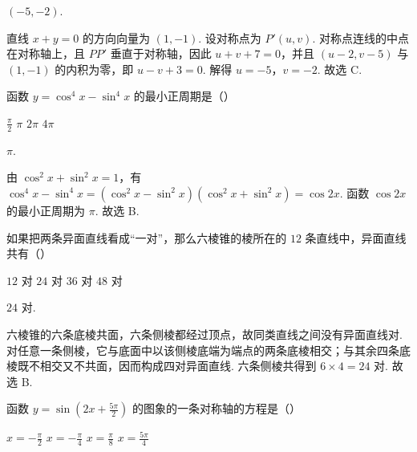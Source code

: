 \documentclass[UTF8,a4paper,oneside,11pt]{ctexbook}
\begin{document}
\begin{answer}
\((-5,-2)\).
\end{answer}

\begin{solution}
直线 \(x+y=0\) 的方向向量为 \((1,-1)\). 设对称点为 \(P'(u,v)\). 对称点连线的中点在对称轴上，且 \(PP'\) 垂直于对称轴，因此 \(u+v+7=0\)，并且 \((u-2,v-5)\) 与 \((1,-1)\) 的内积为零，即 \(u-v+3=0\). 解得 \(u=-5\)，\(v=-2\). 故选 C.
\end{solution}

\begin{problem}
函数 \(y = \cos^{4} x - \sin^{4} x\) 的最小正周期是（\quad）

\choices
    {\(\frac{\pi}{2}\)}
    {\(\pi\)}
    {\(2\pi\)}
    {\(4\pi\)}
\end{problem}

\begin{answer}
\(\pi\).
\end{answer}

\begin{solution}
由 \(\cos^2x+\sin^2x=1\)，有 \(\cos^4x-\sin^4x=(\cos^2x-\sin^2x)(\cos^2x+\sin^2x)=\cos2x\). 函数 \(\cos2x\) 的最小正周期为 \(\pi\). 故选 B.
\end{solution}

\begin{problem}
如果把两条异面直线看成“一对”，那么六棱锥的棱所在的 \(12\) 条直线中，异面直线共有（\quad）

\choices
    {\(12\) 对}
    {\(24\) 对}
    {\(36\) 对}
    {\(48\) 对}
\end{problem}

\begin{answer}
\(24\) 对.
\end{answer}

\begin{solution}
六棱锥的六条底棱共面，六条侧棱都经过顶点，故同类直线之间没有异面直线对. 对任意一条侧棱，它与底面中以该侧棱底端为端点的两条底棱相交；与其余四条底棱既不相交又不共面，因而构成四对异面直线. 六条侧棱共得到 \(6\times4=24\) 对. 故选 B.
\end{solution}

\begin{problem}
函数 \(y = \sin \left(2x + \frac{5\pi}{2}\right)\) 的图象的一条对称轴的方程是（\quad）

\choices
    {\(x = -\frac{\pi}{2}\)}
    {\(x = -\frac{\pi}{4}\)}
    {\(x = \frac{\pi}{8}\)}
    {\(x = \frac{5\pi}{4}\)}
\end{problem}
\end{document}
